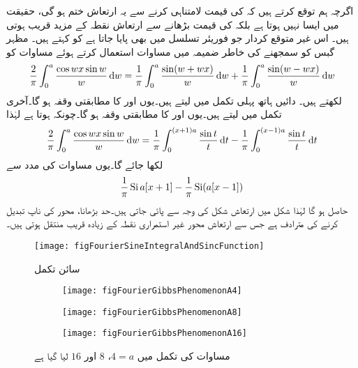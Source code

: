 اگرچہ ہم توقع کرتے ہیں کہ  کی قیمت لامتناہی کرنے سے  یہ ارتعاش ختم ہو گی، حقیقت میں ایسا نہیں ہوتا ہے بلکہ  کی قیمت بڑھانے سے ارتعاش  نقطہ  کے مزید قریب ہوتی ہیں۔ اس غیر متوقع کردار جو فوریئر تسلسل میں بھی پایا جاتا ہے کو  کہتے ہیں۔ مظہر گبس کو سمجھنے کی خاطر  ضمیمہ  میں مساوات  استعمال کرتے ہوئے مساوات  کو 
\begin{align*}
\frac{2}{\pi}\int_0^a\frac{\cos wx\sin w}{w}\dif w=\frac{1}{\pi}\int_0^a \frac{\sin(w+wx)}{w}\dif w+\frac{1}{\pi}\int_0^a 
\frac{\sin(w-wx)}{w}\dif w
\end{align*}
لکھتے ہیں۔ دائیں ہاتھ پہلی تکمل میں  لیتے ہیں۔یوں   اور  کا مطابقتی وقفہ  ہو گا۔آخری تکمل میں  لیتے ہیں۔یوں   اور  کا مطابقتی وقفہ  ہو گا۔چونکہ  ہوتا ہے لہٰذا
\begin{align*}
\frac{2}{\pi}\int_0^a\frac{\cos wx\sin w}{w}\dif w=\frac{1}{\pi}\int_0^{(x+1)a}\frac{\sin t}{t}\dif t-\frac{1}{\pi}\int_0^{(x-1)a} \frac{\sin t}{t}\dif t
\end{align*}
 لکھا جائے گا۔یوں مساوات  کی مدد سے
\begin{align*}
\frac{1}{\pi}\operatorname{Si}{a[x+1]}-\frac{1}{\pi}\operatorname{Si}(a[x-1])
\end{align*}
حاصل ہو گا لہٰذا شکل  میں ارتعاش شکل  کی وجہ سے پائی جاتی ہیں۔حد  بڑھانا، محور کی ناپ تبدیل کرنے کی مترادف ہے جس سے ارتعاش محور غیر استمراری نقطہ کے زیادہ قریب منتقل ہوتی ہیں۔
\begin{figure}
\centering
\texttt{[image: figFourierSineIntegralAndSincFunction]}
\caption{سائن تکمل}
\label{شکل_فوریئر_سائن_تکمل}
\end{figure}
%
\begin{figure}
\centering
\begin{subfigure}{0.5\textwidth}
\centering
\texttt{[image: figFourierGibbsPhenomenonA4]}
\end{subfigure}%
\begin{subfigure}{0.5\textwidth}
\centering
\texttt{[image: figFourierGibbsPhenomenonA8]}
\end{subfigure}
\begin{subfigure}{0.5\textwidth}
\centering
\texttt{[image: figFourierGibbsPhenomenonA16]}
\end{subfigure}
\caption{مساوات  کی تکمل میں $4=a$، $8$ اور $16$ لیا گیا ہے}
\label{شکل_فوریئر_مظہر_گبس}
\end{figure}

